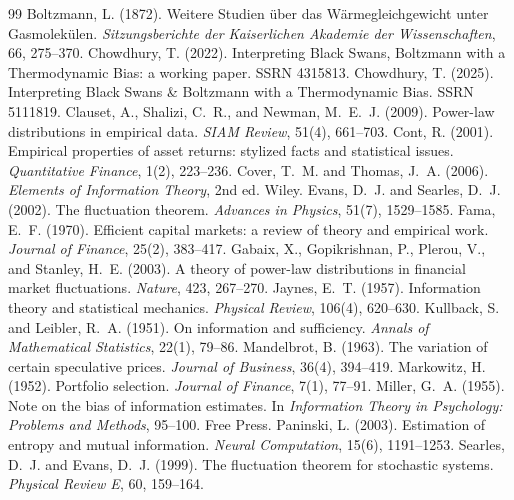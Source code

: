 \documentclass[11pt]{article}
\begin{document}
\begin{thebibliography}{99}
 Boltzmann, L. (1872). Weitere Studien \"uber das W\"armegleichgewicht unter Gasmolek\"ulen. \emph{Sitzungsberichte der Kaiserlichen Akademie der Wissenschaften}, 66, 275--370.
 Chowdhury, T. (2022). Interpreting Black Swans, Boltzmann with a Thermodynamic Bias: a working paper. SSRN 4315813.
 Chowdhury, T. (2025). Interpreting Black Swans \& Boltzmann with a Thermodynamic Bias. SSRN 5111819.
 Clauset, A., Shalizi, C.~R., and Newman, M.~E.~J. (2009). Power-law distributions in empirical data. \emph{SIAM Review}, 51(4), 661--703.
 Cont, R. (2001). Empirical properties of asset returns: stylized facts and statistical issues. \emph{Quantitative Finance}, 1(2), 223--236.
 Cover, T.~M. and Thomas, J.~A. (2006). \emph{Elements of Information Theory}, 2nd ed. Wiley.
 Evans, D.~J. and Searles, D.~J. (2002). The fluctuation theorem. \emph{Advances in Physics}, 51(7), 1529--1585.
 Fama, E.~F. (1970). Efficient capital markets: a review of theory and empirical work. \emph{Journal of Finance}, 25(2), 383--417.
 Gabaix, X., Gopikrishnan, P., Plerou, V., and Stanley, H.~E. (2003). A theory of power-law distributions in financial market fluctuations. \emph{Nature}, 423, 267--270.
 Jaynes, E.~T. (1957). Information theory and statistical mechanics. \emph{Physical Review}, 106(4), 620--630.
 Kullback, S. and Leibler, R.~A. (1951). On information and sufficiency. \emph{Annals of Mathematical Statistics}, 22(1), 79--86.
 Mandelbrot, B. (1963). The variation of certain speculative prices. \emph{Journal of Business}, 36(4), 394--419.
 Markowitz, H. (1952). Portfolio selection. \emph{Journal of Finance}, 7(1), 77--91.
 Miller, G.~A. (1955). Note on the bias of information estimates. In \emph{Information Theory in Psychology: Problems and Methods}, 95--100. Free Press.
 Paninski, L. (2003). Estimation of entropy and mutual information. \emph{Neural Computation}, 15(6), 1191--1253.
 Searles, D.~J. and Evans, D.~J. (1999). The fluctuation theorem for stochastic systems. \emph{Physical Review E}, 60, 159--164.

\end{thebibliography}
\end{document}
